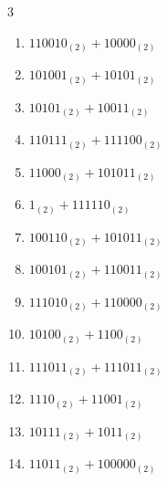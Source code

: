 \begin{multicols}{3}
\begin{enumerate}
  \item $110010_{(2)} + 10000_{(2)}$


  \item $101001_{(2)} + 10101_{(2)}$


  \item $10101_{(2)} + 10011_{(2)}$


  \item $110111_{(2)} + 111100_{(2)}$


  \item $11000_{(2)} + 101011_{(2)}$


  \item $1_{(2)} + 111110_{(2)}$


\columnbreak %

  \item $100110_{(2)} + 101011_{(2)}$


  \item $100101_{(2)} + 110011_{(2)}$


  \item $111010_{(2)} + 110000_{(2)}$


  \item $10100_{(2)} + 1100_{(2)}$


  \item $111011_{(2)} + 111011_{(2)}$


  \item $1110_{(2)} + 11001_{(2)}$


  \item $10111_{(2)} + 1011_{(2)}$


  \item $11011_{(2)} + 100000_{(2)}$


\end{enumerate}
\end{multicols}
